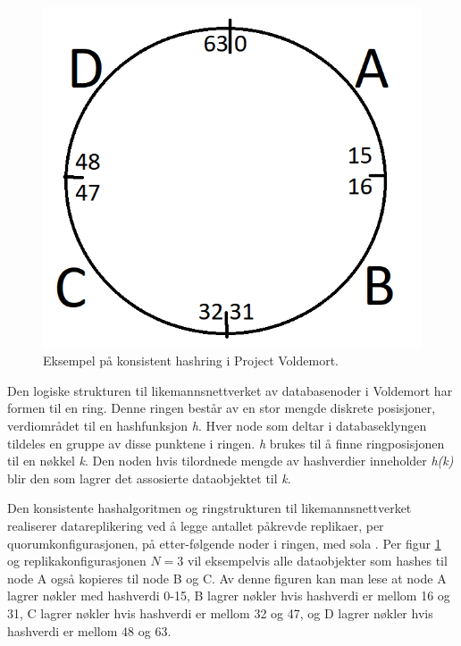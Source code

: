 \begin{figure}[!ht]
    \centering
    \includegraphics{fig/hashring.png}
    \caption{Eksempel på konsistent hashring i Project Voldemort.}
    \label{fig4}
\end{figure}

Den logiske strukturen til likemannsnettverket av databasenoder i Voldemort har formen til en ring. Denne ringen består av en stor mengde diskrete posisjoner, verdiområdet til en hashfunksjon \emph{h}. Hver node som deltar i databaseklyngen tildeles en gruppe av disse punktene i ringen. \emph{h} brukes til å finne ringposisjonen til en nøkkel \emph{k}. Den noden hvis tilordnede mengde av hashverdier inneholder \emph{h(k)} blir den som lagrer det assosierte dataobjektet til \emph{k}.

Den konsistente hashalgoritmen og ringstrukturen til likemannsnettverket realiserer datareplikering ved å legge antallet påkrevde replikaer, per quorumkonfigurasjonen, på etter-følgende noder i ringen, med sola \citep{elmasri2014}. Per figur \ref{fig4} og replikakonfigurasjonen \(N=3\) vil eksempelvis alle dataobjekter som hashes til node A også kopieres til node B og C. Av denne figuren kan man lese at node A lagrer nøkler med hashverdi 0-15, B lagrer nøkler hvis hashverdi er mellom 16 og 31, C lagrer nøkler hvis hashverdi er mellom 32 og 47, og D lagrer nøkler hvis hashverdi er mellom 48 og 63.

